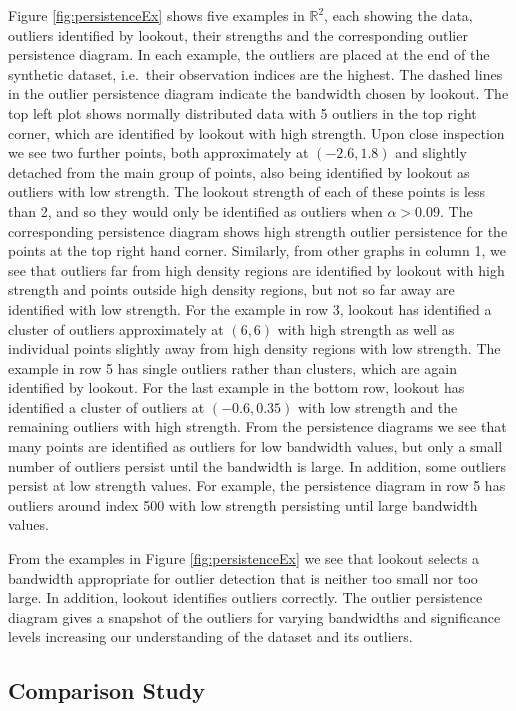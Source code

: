 \documentclass[
]{article}
\begin{document}
Figure \ref{fig:persistenceEx} shows five examples in \(\mathbb{R}^2\),
each showing the data, outliers identified by lookout, their strengths
and the corresponding outlier persistence diagram. In each example, the
outliers are placed at the end of the synthetic dataset, i.e.~their
observation indices are the highest. The dashed lines in the outlier
persistence diagram indicate the bandwidth chosen by lookout. The top
left plot shows normally distributed data with 5 outliers in the top
right corner, which are identified by lookout with high strength. Upon
close inspection we see two further points, both approximately at
\((-2.6, 1.8)\) and slightly detached from the main group of points,
also being identified by lookout as outliers with low strength. The
lookout strength of each of these points is less than 2, and so they
would only be identified as outliers when \(\alpha > 0.09\). The
corresponding persistence diagram shows high strength outlier
persistence for the points at the top right hand corner. Similarly, from
other graphs in column 1, we see that outliers far from high density
regions are identified by lookout with high strength and points outside
high density regions, but not so far away are identified with low
strength. For the example in row 3, lookout has identified a cluster of
outliers approximately at \((6,6)\) with high strength as well as
individual points slightly away from high density regions with low
strength. The example in row 5 has single outliers rather than clusters,
which are again identified by lookout. For the last example in the
bottom row, lookout has identified a cluster of outliers at
\((-0.6, 0.35)\) with low strength and the remaining outliers with high
strength. From the persistence diagrams we see that many points are
identified as outliers for low bandwidth values, but only a small number
of outliers persist until the bandwidth is large. In addition, some
outliers persist at low strength values. For example, the persistence
diagram in row 5 has outliers around index 500 with low strength
persisting until large bandwidth values.

From the examples in Figure \ref{fig:persistenceEx} we see that lookout
selects a bandwidth appropriate for outlier detection that is neither
too small nor too large. In addition, lookout identifies outliers
correctly. The outlier persistence diagram gives a snapshot of the
outliers for varying bandwidths and significance levels increasing our
understanding of the dataset and its outliers.

\hypertarget{sec:SyntheticComparison}{%
\subsection{Comparison Study}\label{sec:SyntheticComparison}}
\end{document}
